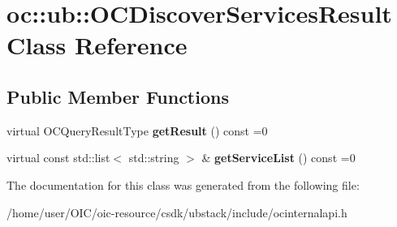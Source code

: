 \hypertarget{classoc_1_1ub_1_1OCDiscoverServicesResult}{}\section{oc\+:\+:ub\+:\+:O\+C\+Discover\+Services\+Result Class Reference}
\label{classoc_1_1ub_1_1OCDiscoverServicesResult}
\subsection*{Public Member Functions}
\begin{DoxyCompactItemize}
\item 
\hypertarget{classoc_1_1ub_1_1OCDiscoverServicesResult_ac5c60333aecd36c14fc13c82600de3ef}{}virtual O\+C\+Query\+Result\+Type {\bfseries get\+Result} () const =0\label{classoc_1_1ub_1_1OCDiscoverServicesResult_ac5c60333aecd36c14fc13c82600de3ef}

\item 
\hypertarget{classoc_1_1ub_1_1OCDiscoverServicesResult_a5cf0b08937a9a7c96b64d4ee281abf6d}{}virtual const std\+::list$<$ std\+::string $>$ \& {\bfseries get\+Service\+List} () const =0\label{classoc_1_1ub_1_1OCDiscoverServicesResult_a5cf0b08937a9a7c96b64d4ee281abf6d}

\end{DoxyCompactItemize}


The documentation for this class was generated from the following file\+:\begin{DoxyCompactItemize}
\item 
/home/user/\+O\+I\+C/oic-\/resource/csdk/ubstack/include/ocinternalapi.\+h\end{DoxyCompactItemize}
